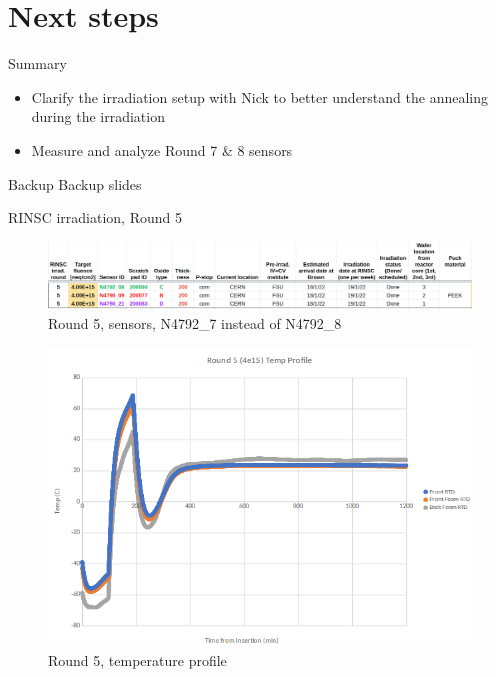 \documentclass{beamer}
\begin{document}
\section{Next steps}
\begin{frame}{Summary}
  \begin{itemize}
    \item Clarify the irradiation setup with Nick to better understand the annealing during the irradiation
    \item Measure and analyze Round 7 \& 8 sensors
  \end{itemize}
\end{frame}

\appendix

\begin{frame}{Backup}
	\center
	\huge
	Backup slides
\end{frame}


\begin{frame}{RINSC irradiation, Round 5}

    \begin{figure}
        \includegraphics[width=.7\textwidth]{plots/Round_5_sensors.png}
        \caption{Round 5, sensors, N4792\_7 instead of N4792\_8}
    \end{figure}
    \begin{figure}
      \includegraphics[width=.5\textwidth]{plots/Round5_temp_profile.png}
      \caption{Round 5, temperature profile}
    \end{figure}
\end{frame}
\end{document}
